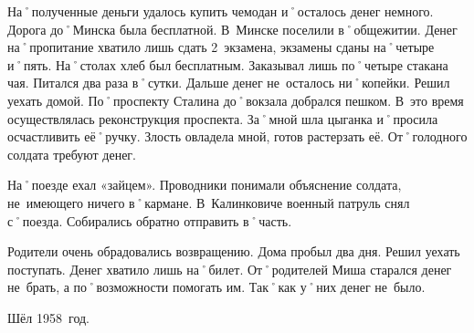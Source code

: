 На˚полученные деньги удалось купить чемодан и˚осталось денег немного. Дорога до˚Минска была бесплатной. В~Минске поселили в˚общежитии. Денег на˚пропитание хватило лишь сдать 2~экзамена, экзамены сданы на˚четыре и˚пять. На˚столах хлеб был бесплатным. Заказывал лишь по˚четыре стакана чая. Питался два раза в˚сутки. Дальше денег не~осталось ни˚копейки. Решил уехать домой. По˚проспекту Сталина до˚вокзала добрался пешком. В~это время осуществлялась реконструкция проспекта. За˚мной шла цыганка и˚просила осчастливить её˚ручку. Злость овладела мной, готов растерзать её. От˚голодного солдата требуют денег.

На˚поезде ехал «зайцем». Проводники понимали объяснение солдата, не~имеющего ничего в˚кармане. В~Калинковиче военный патруль снял с˚поезда. Собирались обратно отправить в˚часть. 

Родители очень обрадовались возвращению. Дома пробыл два дня. Решил уехать поступать. Денег хватило лишь на˚билет. От˚родителей Миша старался денег не~брать, а по˚возможности помогать им. Так˚как у˚них денег не~было.

Шёл 1958~год.
